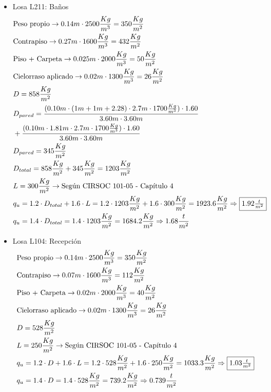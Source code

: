 \begin{enumerate}
\begin{itemize}
\item Losa L211: Baños
\begin{align*}
& \text{Peso propio} \rightarrow 0.14m \cdot 2500 \frac{Kg}{m^3} = 350 \frac{Kg}{m^2}\\
& \text{Contrapiso} \rightarrow 0.27m \cdot 1600 \frac{Kg}{m^3} = 432 \frac{Kg}{m^2}\\
& \text{Piso + Carpeta} \rightarrow 0.025m \cdot 2000 \frac{Kg}{m^3} = 50 \frac{Kg}{m^2}\\
& \text{Cielorraso aplicado} \rightarrow  0.02m \cdot 1300 \frac{Kg}{m^3} = 26 \frac{Kg}{m^2}\\
& D = 858 \frac{Kg}{m^2}\\
& D_{pared} = \frac{(0.10m \cdot (1m+1m+2.28) \cdot 2.7m \cdot 1700 \frac{Kg}{m^3}) \cdot 1.60}{3.60m \cdot 3.60m}\\
& + \frac{(0.10m \cdot 1.81m \cdot 2.7m \cdot 1700 \frac{Kg}{m^3}) \cdot 1.60}{3.60m \cdot 3.60m}\\
& D_{pared} = 345 \frac{Kg}{m^2} \\
& D_{total} = 858 \frac{Kg}{m^2} + 345 \frac{Kg}{m^2} = 1203 \frac{Kg}{m^2}\\
& L = 300 \frac{Kg}{m^2} \rightarrow \text{Según CIRSOC 101-05 - Capítulo 4}\\
& q_u = 1.2 \cdot D_{total} + 1.6 \cdot L = 1.2 \cdot 1203 \frac{Kg}{m^2} + 1.6 \cdot 300 \frac{Kg}{m^2} = 1923.6 \frac{Kg}{m^2} \Rightarrow \framebox{$1.92 \frac{t}{m^2}$}\\
& q_u = 1.4 \cdot D_{total} = 1.4 \cdot 1203 \frac{Kg}{m^2} = 1684.2 \frac{Kg}{m^2} \Rightarrow 1.68 \frac{t}{m^2}
\end{align*}

\item Losa L104: Recepción
\begin{align*}
& \text{Peso propio} \rightarrow 0.14m \cdot 2500 \frac{Kg}{m^3} = 350 \frac{Kg}{m^2}\\
& \text{Contrapiso} \rightarrow 0.07m \cdot 1600 \frac{Kg}{m^3} = 112 \frac{Kg}{m^2}\\
& \text{Piso + Carpeta} \rightarrow 0.02m \cdot 2000 \frac{Kg}{m^3} = 40 \frac{Kg}{m^2}\\
& \text{Cielorraso aplicado} \rightarrow  0.02m \cdot 1300 \frac{Kg}{m^3} = 26 \frac{Kg}{m^2}\\
& D = 528 \frac{Kg}{m^2}\\
& L = 250 \frac{Kg}{m^2} \rightarrow \text{Según CIRSOC 101-05 - Capítulo 4}\\
& q_u = 1.2 \cdot D + 1.6 \cdot L = 1.2 \cdot 528 \frac{Kg}{m^2} + 1.6 \cdot 250 \frac{Kg}{m^2} = 1033.3 \frac{Kg}{m^2} \Rightarrow \framebox{$1.03 \frac{t}{m^2}$} \\
& q_u = 1.4 \cdot D = 1.4 \cdot 528 \frac{Kg}{m^2} = 739.2 \frac{Kg}{m^2} \Rightarrow 0.739 \frac{t}{m^2}
\end{align*}


\end{itemize}
\end{enumerate}
